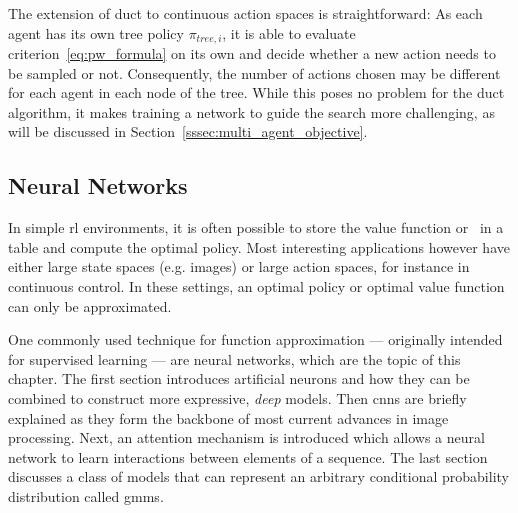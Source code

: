 The extension of \gls{duct} to continuous action spaces is straightforward: As each agent has its own tree policy $\pi_{tree, i}$, it is able to evaluate criterion~\ref{eq:pw_formula} on its own and decide whether a new action needs to be sampled or not. Consequently, the number of actions chosen may be different for each agent in each node of the tree. While this poses no problem for the \gls{duct} algorithm, it makes training a network to guide the search more challenging, as will be discussed in Section~\ref{sssec:multi_agent_objective}.


\glsresetall
\subsection{Neural Networks}\label{ssec:nns}
In simple \gls{rl} environments, it is often possible to store the value function or \Q\ in a table and compute the optimal policy. Most interesting applications however have either large state spaces (e.g. images) or large action spaces, for instance in continuous control. In these settings, an optimal policy or optimal value function can only be approximated.

One commonly used technique for function approximation --- originally intended for supervised learning --- are neural networks, which are the topic of this chapter. The first section introduces artificial neurons and how they can be combined to construct more expressive, \emph{deep} models. Then \glspl{cnn} are briefly explained as they form the backbone of most current advances in image processing. Next, an attention mechanism is introduced which allows a neural network to learn interactions between elements of a sequence. The last section discusses a class of models that can represent an arbitrary conditional probability distribution called \glspl{gmm}.

